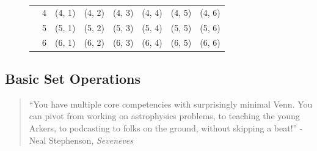 \documentclass[12pt]{article}
\theoremstyle{definition}
\theoremstyle{remark}
\begin{document}
\begin{figure}[H]
\begin{tabular}{llllllll}
           & \multicolumn{1}{l|}{4} & (4, 1)                                              & \multicolumn{1}{l|}{(4, 2)}                         & \multicolumn{1}{l|}{\cellcolor[HTML]{F8FF00}(4, 3)} & (4, 4)                                              & (4, 5)                                              & \multicolumn{1}{l|}{(4, 6)}                         \\ \cline{4-5}
           & \multicolumn{1}{l|}{5} & \multicolumn{1}{l|}{(5, 1)}                         & \multicolumn{1}{l|}{\cellcolor[HTML]{F8FF00}(5, 2)} & (5, 3)                                              & (5, 4)                                              & (5, 5)                                              & \multicolumn{1}{l|}{(5, 6)}                         \\ \cline{3-4}
           & \multicolumn{1}{l|}{6} & \multicolumn{1}{l|}{\cellcolor[HTML]{F8FF00}(6, 1)} & (6, 2)                                              & (6, 3)                                              & (6, 4)                                              & (6, 5)                                              & \multicolumn{1}{l|}{(6, 6)}                         \\ \cline{3-8} 
\end{tabular}
\end{figure}

\subsection{Basic Set Operations}

\begin{quotation}
``You have multiple core competencies with surprisingly minimal Venn. You can pivot from working on astrophysics problems, to teaching the young Arkers, to podcasting to folks on the ground, without skipping a beat!'' - Neal Stephenson, \emph{Seveneves}
\end{quotation}
\end{document}

